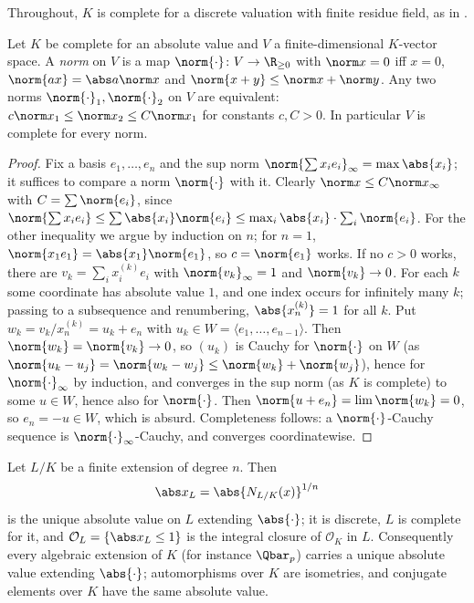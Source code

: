 Throughout, $K$ is complete for a discrete valuation with finite residue field, as in .

\begin{lemma}\label{lem:local:norms}
Let $K$ be complete for an absolute value and $V$ a finite-dimensional $K$-vector space. A \emph{norm} on $V$ is a map $\norm{\cdot}\colon V\to\R_{\ge0}$ with
$\norm x=0$ iff $x=0$, $\norm{ax}=\abs a\norm x$ and $\norm{x+y}\le\norm x+\norm y$. Any two norms $\norm{\cdot}_1,\norm{\cdot}_2$ on $V$ are equivalent:
$c\norm x_1\le\norm x_2\le C\norm x_1$ for constants $c,C>0$. In particular $V$ is complete for every norm.
\end{lemma}

\begin{proof}
Fix a basis $e_1,\dots,e_n$ and the sup norm $\norm{\sum x_ie_i}_\infty=\max\abs{x_i}$; it suffices to compare a norm $\norm{\cdot}$ with it. Clearly
$\norm x\le C\norm x_\infty$ with $C=\sum\norm{e_i}$, since $\norm{\sum x_ie_i}\le\sum\abs{x_i}\norm{e_i}\le\max_i\abs{x_i}\cdot\sum_i\norm{e_i}$. For the other
inequality we argue by induction on $n$; for $n=1$, $\norm{x_1e_1}=\abs{x_1}\norm{e_1}$, so $c=\norm{e_1}$ works. If no $c>0$
works, there are $v_k=\sum_ix_i^{(k)}e_i$ with $\norm{v_k}_\infty=1$ and $\norm{v_k}\to0$. For each $k$ some coordinate has absolute value $1$, and one index occurs
for infinitely many $k$; passing to a subsequence and renumbering, $\abs{x_n^{(k)}}=1$
for all $k$. Put $w_k=v_k/x_n^{(k)}=u_k+e_n$ with $u_k\in W=\langle e_1,\dots,e_{n-1}\rangle$. Then $\norm{w_k}=\norm{v_k}\to0$, so $(u_k)$ is Cauchy for $\norm{\cdot}$ on
$W$ (as $\norm{u_k-u_j}=\norm{w_k-w_j}\le\norm{w_k}+\norm{w_j}$), hence for $\norm{\cdot}_\infty$ by induction, and converges in the sup norm (as $K$ is complete) to some $u\in W$, hence also for $\norm{\cdot}$.
Then $\norm{u+e_n}=\lim\norm{w_k}=0$, so $e_n=-u\in W$, which is absurd. Completeness follows: a $\norm{\cdot}$-Cauchy sequence is
$\norm{\cdot}_\infty$-Cauchy, and converges coordinatewise.
\end{proof}

\begin{theorem}\label{thm:local:extension-absval}
Let $L/K$ be a finite extension of degree $n$. Then
\[
\abs x_L=\abs{N_{L/K}(x)}^{1/n}
\]
is the unique absolute value on $L$ extending $\abs{\cdot}$; it is discrete, $L$ is complete for it, and $\mathcal O_L=\{\abs x_L\le1\}$ is the
integral closure of $\mathcal O_K$ in $L$. Consequently every algebraic extension of $K$ (for instance $\Qbar_p$) carries a unique absolute value
extending $\abs{\cdot}$; automorphisms over $K$ are isometries, and conjugate elements over $K$ have the same absolute value.
\end{theorem}

